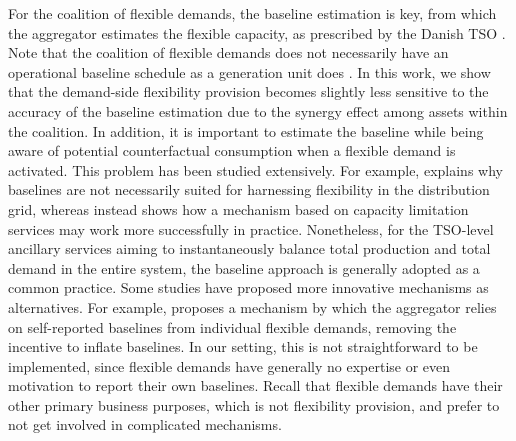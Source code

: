 \documentclass[conference]{IEEEtran}
\begin{document}
For the coalition of flexible demands, the baseline estimation is key, from which the aggregator estimates the flexible capacity, as prescribed by the Danish TSO \cite{energinet:prequalification}. Note that the coalition of flexible demands does not necessarily have an operational baseline schedule as a generation unit does \cite{gade2022ecosystem}.
%
In this work, we show that the demand-side flexibility provision becomes slightly less sensitive to the accuracy of the baseline estimation due to the synergy effect among assets within the coalition. 
In addition, it is important to estimate the baseline while being aware of potential counterfactual consumption when a flexible demand is activated. This problem has been studied extensively. For example, \cite{ziras2021baselines} explains why baselines are not necessarily suited for harnessing flexibility in the distribution grid, whereas \cite{capacity_limitation_services} instead shows how a mechanism based on capacity limitation services may work more successfully in practice. Nonetheless, for the TSO-level ancillary services aiming to instantaneously balance total production and total demand in the entire system, the baseline approach is generally adopted as a common practice. Some studies have proposed more innovative mechanisms as alternatives. For example, \cite{muthirayan2019mechanism} proposes a mechanism by which the aggregator relies on self-reported baselines from individual flexible demands, removing the incentive to inflate baselines. In our setting, this is not straightforward to be implemented, since flexible demands have generally no expertise or even motivation to report their own baselines. Recall that flexible demands have their other primary business purposes, which is not flexibility provision, and prefer to not get involved in complicated mechanisms.



\end{document}
